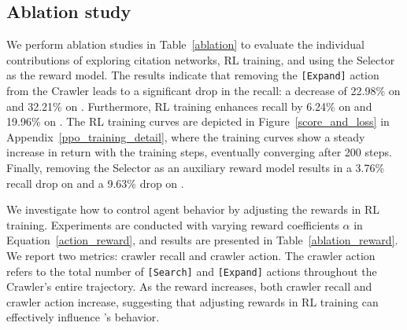 \subsection{Ablation study}

We perform ablation studies in Table~\ref{ablation} to evaluate the individual contributions of exploring citation networks, RL training, and using the Selector as the reward model. The results indicate that removing the \texttt{[Expand]} action from the Crawler leads to a significant drop in the recall: a decrease of 22.98\% on \autoS and 32.21\% on \realS. Furthermore, RL training enhances recall by 6.24\% on \autoS and 19.96\% on \realS. The RL training curves are depicted in Figure~\ref{score_and_loss} in Appendix~\ref{ppo_training_detail}, where the training curves show a steady increase in return with the training steps, eventually converging after 200 steps. Finally, removing the Selector as an auxiliary reward model results in a 3.76\% recall drop on \autoS and a 9.63\% drop on \realS.

We investigate how to control agent behavior by adjusting the rewards in RL training. Experiments are conducted with varying reward coefficients $\alpha$ in Equation~\ref{action_reward}, and results are presented in Table~\ref{ablation_reward}. We report two metrics: crawler recall and crawler action. The crawler action refers to the total number of \texttt{[Search]} and \texttt{[Expand]} actions throughout the Crawler’s entire trajectory. As the reward increases, both crawler recall and crawler action increase, suggesting that adjusting rewards in RL training can effectively influence \pasa's behavior.

\begin{table}[htbp]

\centering
{}
\caption{Performance of the Crawler trained on different reward coefficient $\alpha$ on AutoScholarQuery test set.}
\label{ablation_reward}
\vspace{-0.2cm}
\end{table}

